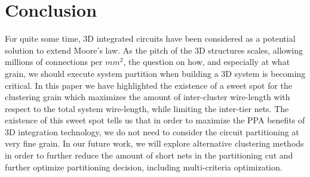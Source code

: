 \documentclass[conference]{IEEEtran}
\begin{document}
\section{Conclusion}\label{sec:concl}
For quite some time, 3D integrated circuits have been considered as a potential solution to extend Moore's law.
As the pitch of the 3D structures scales, allowing millions of connections per $mm^2$, the question on how, and especially at what grain, we should execute system partition when building a 3D system is becoming critical.
In this paper we have highlighted the existence of a sweet spot for the clustering grain which maximizes the amount of inter-cluster wire-length with respect to the total system wire-length, while limiting the inter-tier nets.
The existence of this sweet spot tells us that in order to maximize the PPA benefits of 3D integration technology, we do not need to consider the circuit partitioning at very fine grain.
In our future work, we will explore alternative clustering methods in order to further reduce the amount of short nets in the partitioning cut and further optimize partitioning decision, including multi-criteria optimization.






%


\end{document}
